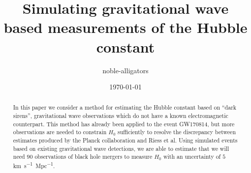 \documentclass[a4paper, amsfonts, amssymb, amsmath, reprint, showkeys, nofootinbib, twoside]{revtex4-1}
\begin{document}
\title{Simulating gravitational wave based measurements of the Hubble constant}

\author{noble-alligators}

\date{\today} %

\begin{abstract}
  In this paper we consider a method for estimating the Hubble constant based on ``dark sirens'', gravitational wave observations which do not have a known electromagnetic counterpart. This method has already been applied to the event GW170814, but more observations are needed to constrain $H_0$ sufficiently to resolve the discrepancy between estimates produced by the Planck collaboration and Riess et al. Using simulated events based on existing gravitational wave detections, we are able to estimate that we will need $90$ observations of black hole mergers  to measure $H_0$ with an uncertainty of $5$ \si{km.s^{-1}.Mpc^{-1}}.
\end{abstract}


\maketitle




%


%

%
%


\appendix

\end{document}
